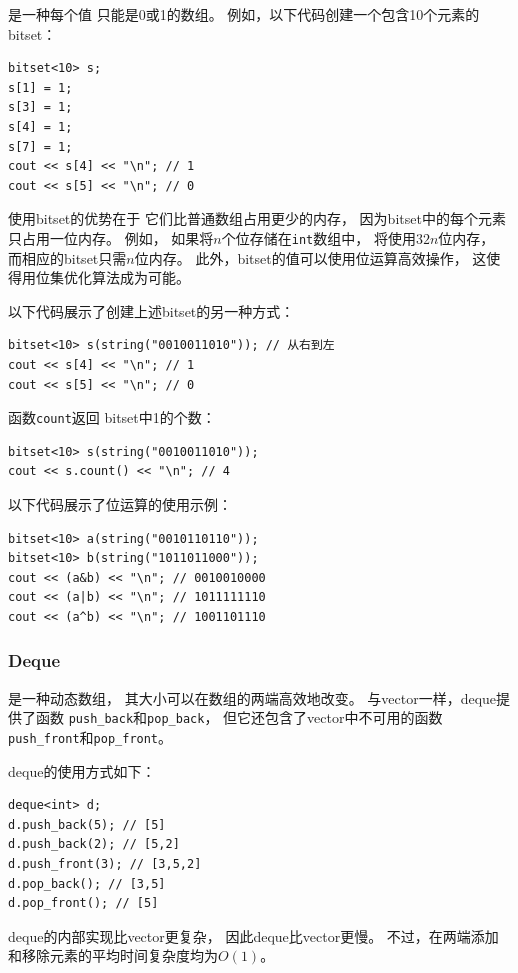 是一种每个值
只能是0或1的数组。
例如，以下代码创建一个包含10个元素的bitset：
\begin{lstlisting}
bitset<10> s;
s[1] = 1;
s[3] = 1;
s[4] = 1;
s[7] = 1;
cout << s[4] << "\n"; // 1
cout << s[5] << "\n"; // 0
\end{lstlisting}

使用bitset的优势在于
它们比普通数组占用更少的内存，
因为bitset中的每个元素只占用一位内存。
例如，
如果将$n$个位存储在\texttt{int}数组中，
将使用$32n$位内存，
而相应的bitset只需$n$位内存。
此外，bitset的值可以使用位运算高效操作，
这使得用位集优化算法成为可能。

以下代码展示了创建上述bitset的另一种方式：
\begin{lstlisting}
bitset<10> s(string("0010011010")); // 从右到左
cout << s[4] << "\n"; // 1
cout << s[5] << "\n"; // 0
\end{lstlisting}

函数\texttt{count}返回
bitset中1的个数：

\begin{lstlisting}
bitset<10> s(string("0010011010"));
cout << s.count() << "\n"; // 4
\end{lstlisting}

以下代码展示了位运算的使用示例：
\begin{lstlisting}
bitset<10> a(string("0010110110"));
bitset<10> b(string("1011011000"));
cout << (a&b) << "\n"; // 0010010000
cout << (a|b) << "\n"; // 1011111110
cout << (a^b) << "\n"; // 1001101110
\end{lstlisting}

\subsubsection{Deque}


是一种动态数组，
其大小可以在数组的两端高效地改变。
与vector一样，deque提供了函数
\texttt{push\_back}和\texttt{pop\_back}，
但它还包含了vector中不可用的函数
\texttt{push\_front}和\texttt{pop\_front}。

deque的使用方式如下：
\begin{lstlisting}
deque<int> d;
d.push_back(5); // [5]
d.push_back(2); // [5,2]
d.push_front(3); // [3,5,2]
d.pop_back(); // [3,5]
d.pop_front(); // [5]
\end{lstlisting}

deque的内部实现比vector更复杂，
因此deque比vector更慢。
不过，在两端添加和移除元素的平均时间复杂度均为$O(1)$。

